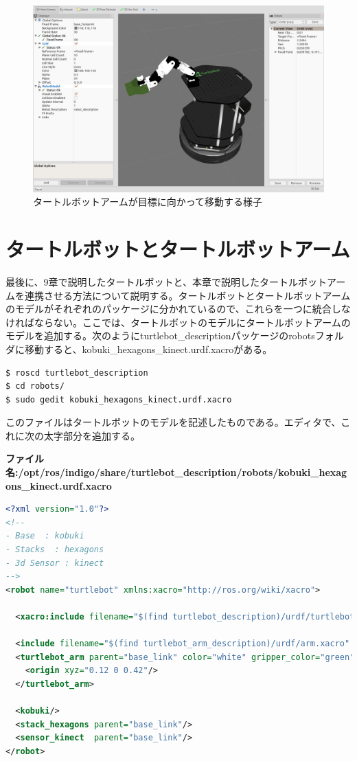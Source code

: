 \begin{figure}[ht]
  \centering
  \includegraphics[width=\columnwidth]{pictures/chapter11/pic_11_42.png}
  \caption{タートルボットアームが目標に向かって移動する様子}
\end{figure}

\section{タートルボットとタートルボットアーム}

最後に、9章で説明したタートルボットと、本章で説明したタートルボットアームを連携させる方法について説明する。タートルボットとタートルボットアームのモデルがそれぞれのパッケージに分かれているので、これらを一つに統合しなければならない。ここでは、タートルボットのモデルにタートルボットアームのモデルを追加する。次のようにturtlebot\_descriptionパッケージのrobotsフォルダに移動すると、kobuki\_hexagons\_kinect.urdf.xacroがある。

\begin{lstlisting}[language=ROS]
$ roscd turtlebot_description
$ cd robots/
$ sudo gedit kobuki_hexagons_kinect.urdf.xacro
\end{lstlisting}

このファイルはタートルボットのモデルを記述したものである。エディタで、これに次の太字部分を追加する。

\textbf{ファイル名:/opt/ros/indigo/share/turtlebot\_description/robots/kobuki\_hexagons\_kinect.urdf.xacro}
\begin{lstlisting}[language=XML]
<?xml version="1.0"?>
<!--
- Base  : kobuki
- Stacks  : hexagons
- 3d Sensor : kinect
-->
<robot name="turtlebot" xmlns:xacro="http://ros.org/wiki/xacro">

  <xacro:include filename="$(find turtlebot_description)/urdf/turtlebot_library.urdf.xacro" />

  <include filename="$(find turtlebot_arm_description)/urdf/arm.xacro" />
  <turtlebot_arm parent="base_link" color="white" gripper_color="green" joints_vlimit="1.571" pan_llimit="-2.617" pan_ulimit="2.617">
    <origin xyz="0.12 0 0.42"/>
  </turtlebot_arm>

  <kobuki/>
  <stack_hexagons parent="base_link"/>
  <sensor_kinect  parent="base_link"/>
</robot>
\end{lstlisting}

